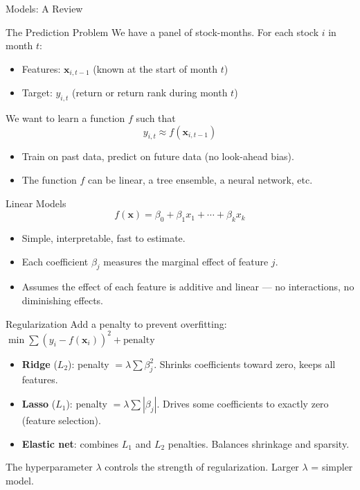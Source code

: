 \documentclass[aspectratio=169,t]{beamer}
\begin{document}

\begin{frame}[c]
\centering
\Huge Models: A Review
\end{frame}

\begin{frame}{The Prediction Problem}
We have a panel of stock-months.  For each stock $i$ in month $t$:
\begin{itemize}
\item Features: $\mathbf{x}_{i,t-1}$ (known at the start of month $t$)
\item Target: $y_{i,t}$ (return or return rank during month $t$)
\end{itemize}

\vspace{0.3cm}
We want to learn a function $f$ such that
\[
y_{i,t} \approx f(\mathbf{x}_{i,t-1})
\]

\vspace{0.3cm}
\begin{itemize}
\item Train on past data, predict on future data (no look-ahead bias).
\item The function $f$ can be linear, a tree ensemble, a neural network, etc.
\end{itemize}
\end{frame}


\begin{frame}{Linear Models}
\[
f(\mathbf{x}) = \beta_0 + \beta_1 x_1 + \cdots + \beta_k x_k
\]

\begin{itemize}
\item Simple, interpretable, fast to estimate.
\item Each coefficient $\beta_j$ measures the marginal effect of feature $j$.
\item Assumes the effect of each feature is \alert{additive and linear} --- no interactions, no diminishing effects.
\end{itemize}
\end{frame}

\begin{frame}{Regularization}
Add a penalty to prevent overfitting: $\min \sum(y_i - f(\mathbf{x}_i))^2 + \text{penalty}$

\begin{itemize}
\item \textbf{Ridge} ($L_2$): penalty $= \lambda\sum\beta_j^2$.  Shrinks coefficients toward zero, keeps all features.
\item \textbf{Lasso} ($L_1$): penalty $= \lambda\sum|\beta_j|$.  Drives some coefficients to exactly zero (feature selection).
\item \textbf{Elastic net}: combines $L_1$ and $L_2$ penalties.  Balances shrinkage and sparsity.
\end{itemize}

\vspace{0.3cm}
The hyperparameter $\lambda$ controls the strength of regularization.  Larger $\lambda$ = simpler model.
\end{frame}
\end{document}
